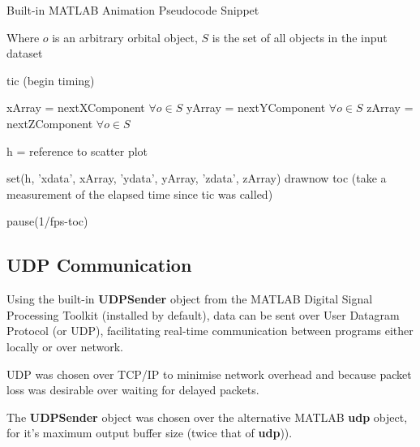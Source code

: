 \documentclass[12pt,openany,a4paper]{book}
\begin{document}
				\begin{algorithm}[H]
					\caption{Built-in MATLAB Animation Pseudocode Snippet}
					\label{aniM}
					Where $o$ is an arbitrary orbital object, $S$ is the set of all objects in the input dataset \newline
					\begin{algorithmic}
						

						
						\State tic (begin timing) \newline
						
						\State xArray = nextXComponent $\forall o \in S$
						\State yArray = nextYComponent $\forall o \in S$
						\State zArray = nextZComponent $\forall o \in S$ \newline 
						
						\State h = reference to scatter plot \newline
						
				    	\State set(h, 'xdata', xArray, 'ydata', yArray, 'zdata', zArray)
				    	\State drawnow
				    	\State toc (take a measurement of the elapsed time since tic was called)\newline
					    
				        \State pause(1/fps-toc)
				    \EndWhile
     				\end{algorithmic}

				\end{algorithm}
		
		\subsection{UDP Communication}
		
		Using the built-in \textbf{UDPSender} object from the MATLAB Digital Signal Processing Toolkit (installed by default),
		data can be sent over User Datagram Protocol (or UDP), facilitating real-time communication between programs either locally or over network. \newline 
		
		UDP was chosen over TCP/IP to minimise network overhead and because packet loss was desirable over waiting for delayed packets. \newline
		
		The \textbf{UDPSender} object was chosen over the alternative MATLAB \textbf{udp} object, for it's maximum output buffer size (twice that of \textbf{udp})). \newline
		
\end{document}
